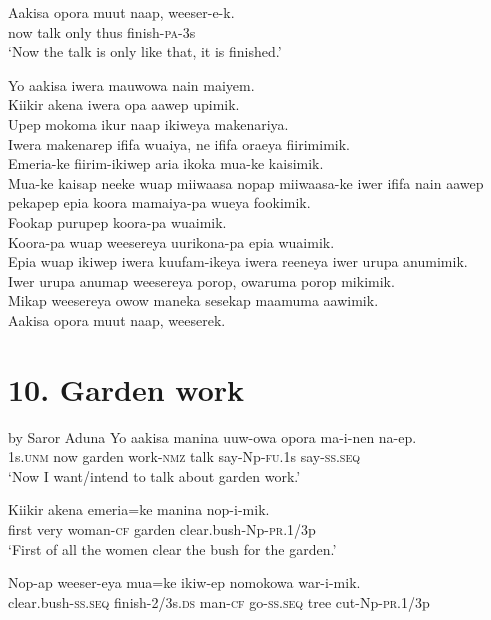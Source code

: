 \ea\label{ex:a:x12}
\gll  Aakisa  opora  muut  naap,  weeser-e-k. \\
now  talk  only  thus  finish-\textsc{pa}-3s \\
\glt ‘Now the talk is only like that, it is finished.’ \\
\z


Yo aakisa iwera mauwowa nain maiyem. \\
Kiikir akena iwera opa aawep upimik. \\
Upep mokoma ikur naap ikiweya makenariya. \\
Iwera makenarep ififa wuaiya, ne ififa oraeya fiirimimik. \\
Emeria-ke fiirim-ikiwep aria ikoka mua-ke kaisimik. \\
Mua-ke kaisap neeke wuap miiwaasa nopap miiwaasa-ke iwer ififa nain aawep pekapep epia koora mamaiya-pa wueya fookimik. \\
Fookap purupep koora-pa wuaimik. \\
Koora-pa wuap weesereya uurikona-pa epia wuaimik. \\
Epia wuap ikiwep iwera kuufam-ikeya iwera reeneya iwer urupa anumimik. \\
Iwer urupa anumap weesereya porop, owaruma porop mikimik. \\
Mikap weesereya owow maneka sesekap maamuma aawimik. \\
\textrm{Aakisa opora muut naap, weeserek.  }
\section{10. Garden work}
 by Saror Aduna
\ea\label{ex:a:x1}
\gll  Yo  aakisa  manina  uuw-owa  opora  ma-i-nen  na-ep. \\
1s.\textsc{unm}  now  garden  work-\textsc{nmz}  talk  say-Np-\textsc{fu}.1s  say-\textsc{ss.seq} \\
\glt ‘Now I want/intend to talk about garden work.’ \\
\z


\ea\label{ex:a:x2}
\gll  Kiikir  akena  emeria=ke  manina  nop-i-mik. \\
first  very  woman-\textsc{cf}  garden  clear.bush-Np-\textsc{pr}.1/3p \\
\glt ‘First of all the women clear the bush for the garden.’ \\
\z


\ea\label{ex:a:x3}
\gll  Nop-ap  weeser-eya  mua=ke  ikiw-ep  nomokowa         war-i-mik. \\
clear.bush-\textsc{ss.seq}  finish-2/3s.\textsc{ds}  man-\textsc{cf}  go-\textsc{ss.seq}  tree  cut-Np-\textsc{pr}.1/3p \\


